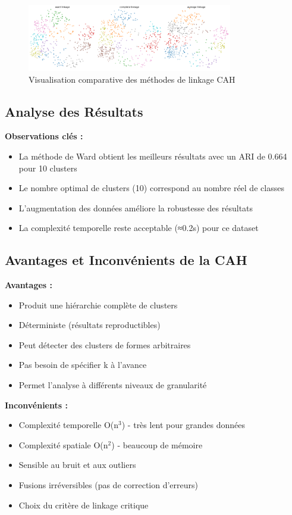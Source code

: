 \documentclass[12pt,a4paper]{article}
\begin{document}
\begin{figure}[H]
    \centering
    \includegraphics[width=0.8\textwidth]{partie2_cah_visualisation.png}
    \caption{Visualisation comparative des méthodes de linkage CAH}
    \label{fig:cah_viz}
\end{figure}

\subsection{Analyse des Résultats}

\textbf{Observations clés :}
\begin{itemize}
    \item La méthode de Ward obtient les meilleurs résultats avec un ARI de 0.664 pour 10 clusters
    \item Le nombre optimal de clusters (10) correspond au nombre réel de classes
    \item L'augmentation des données améliore la robustesse des résultats
    \item La complexité temporelle reste acceptable (≈0.2s) pour ce dataset
\end{itemize}

\subsection{Avantages et Inconvénients de la CAH}

\textbf{Avantages :}
\begin{itemize}
    \item Produit une hiérarchie complète de clusters
    \item Déterministe (résultats reproductibles)
    \item Peut détecter des clusters de formes arbitraires
    \item Pas besoin de spécifier k à l'avance
    \item Permet l'analyse à différents niveaux de granularité
\end{itemize}

\textbf{Inconvénients :}
\begin{itemize}
    \item Complexité temporelle O(n$^3$) - très lent pour grandes données
    \item Complexité spatiale O(n$^2$) - beaucoup de mémoire
    \item Sensible au bruit et aux outliers
    \item Fusions irréversibles (pas de correction d'erreurs)
    \item Choix du critère de linkage critique
\end{itemize}
\end{document}
